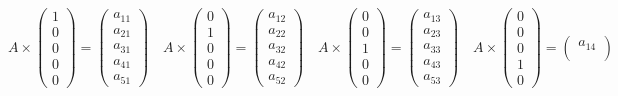 \documentclass{article}
\begin{document}
$$
    A \times \begin{pmatrix}
        1 \\
        0 \\
        0 \\
        0 \\
        0
    \end{pmatrix} = \begin{pmatrix}
        a_{11} \\
        a_{21} \\
        a_{31} \\
        a_{41} \\
        a_{51}
    \end{pmatrix} \quad 
    A \times \begin{pmatrix}
        0 \\
        1 \\
        0 \\
        0 \\
        0
    \end{pmatrix} = \begin{pmatrix}
        a_{12} \\
        a_{22} \\
        a_{32} \\
        a_{42} \\
        a_{52}
    \end{pmatrix} \quad 
    A \times \begin{pmatrix}
        0 \\
        0 \\
        1 \\
        0 \\
        0
    \end{pmatrix} = \begin{pmatrix}
        a_{13} \\
        a_{23} \\
        a_{33} \\
        a_{43} \\
        a_{53}
    \end{pmatrix} \quad 
    A \times \begin{pmatrix}
        0 \\
        0 \\
        0 \\
        1 \\
        0
    \end{pmatrix} = \begin{pmatrix}
        a_{14} \\

\end{pmatrix}$$
\end{document}
